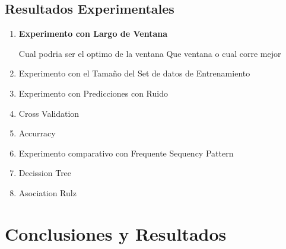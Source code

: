 \subsection{Resultados Experimentales}


\begin{enumerate}
	
	\item \textbf{ Experimento con Largo de Ventana} 
	
	Cual podria ser el optimo de la ventana
	Que ventana o cual corre mejor
	
	
	
	\item Experimento con el Tamaño del Set de datos de Entrenamiento
	
	\item Experimento con Predicciones con Ruido
	
	\item Cross Validation
	
	
	\item Accurracy
	
	
	\item Experimento comparativo con Frequente Sequency Pattern
	
	\item Decission Tree
	
	\item Asociation Rulz
		
	
	
	
	
	
\end{enumerate}




\section{Conclusiones y Resultados}





